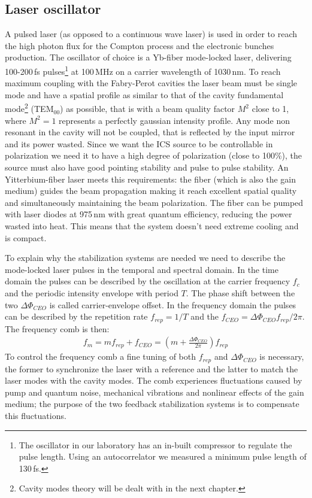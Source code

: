 \subsection{Laser oscillator}
A pulsed laser (as opposed to a continuous wave laser) is used in order to reach the high photon flux for the Compton process and the electronic bunches production. The oscillator of choice is a Yb-fiber mode-locked laser, delivering 100-200\,fs pulses\footnote{The oscillator in our laboratory has an in-built compressor to regulate the pulse length. Using an autocorrelator we measured a minimum pulse length of 130\,fs.} at 100\,MHz on a carrier wavelength of 1030\,nm. To reach maximum coupling with the Fabry-Perot cavities the laser beam must be single mode and have a spatial profile as similar to that of the cavity fundamental mode\footnote{Cavity modes theory will be dealt with in the next chapter.} (TEM$_{00}$) as possible, that is with a beam quality factor $M^2$ close to 1, where $M^2=1$ represents a perfectly gaussian intensity profile. Any mode non resonant in the cavity will not be coupled, that is reflected by the input mirror and its power wasted. Since we want the ICS source to be controllable in polarization we need it to have a high degree of polarization (close to  100\%), the source must also have good pointing stability and pulse to pulse stability. An Yitterbium-fiber laser meets this requirements: the fiber (which is also the gain medium) guides the beam propagation making it reach excellent spatial quality and simultaneously maintaining the beam polarization. The fiber can be pumped with laser diodes at 975\,nm with great quantum efficiency, reducing the power wasted into heat. This means that the system doesn't need extreme cooling and is compact.

To explain why the stabilization systems are needed we need to describe the mode-locked laser pulses in the temporal and spectral domain. In the time domain the pulses can be described by the oscillation at the carrier frequency $f_c$ and the periodic intensity envelope with period $T$. The phase shift between the two $\Delta\Phi_{CEO}$ is called carrier-envelope offset. In the frequency domain the pulses can be described by the repetition rate $f_{rep}=1/T$ and the $f_{CEO}=\Delta\Phi_{CEO} f_{rep}/2\pi$. The frequency comb is then:
\begin{align}
f_m = m f_{rep} + f_{CEO} = \left(m  + \frac{\Delta\Phi_{CEO}}{2\pi}\right) f_{rep}
\end{align}
To control the frequency comb a fine tuning of both $f_{rep}$ and $\Delta\Phi_{CEO}$ is necessary, the former to synchronize the laser with a reference and the latter to match the laser modes with the cavity modes.
The comb experiences fluctuations caused by pump and quantum noise, mechanical vibrations and nonlinear effects of the gain medium; the purpose of the two feedback stabilization systems is to compensate this fluctuations.

